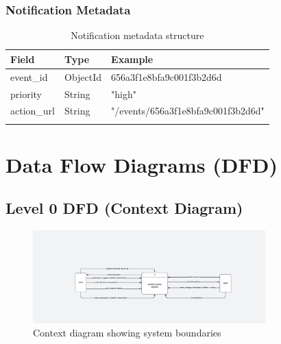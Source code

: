 \subsubsection{Notification Metadata}
\begin{longtable}{|C{2.5cm}|C{1.8cm}|C{7cm}|}
\hline
\textbf{Field} & \textbf{Type} & \textbf{Example} \\ \hline
\endhead

event\_id & ObjectId & 656a3f1e8bfa9c001f3b2d6d \\ \hline
priority & String & "high" \\ \hline
action\_url & String & "/events/656a3f1e8bfa9c001f3b2d6d" \\ \hline

\caption{Notification metadata structure}
\label{tab:notification_metadata}
\end{longtable}

\section{Data Flow Diagrams (DFD)}

\subsection{Level 0 DFD (Context Diagram)}
\begin{figure}[H]
    \centering
    \includegraphics[width=0.8\textwidth]{latex-doc/images/dfd_level0.png}
    \caption{Context diagram showing system boundaries}
    \label{fig:dfd0}
\end{figure}

